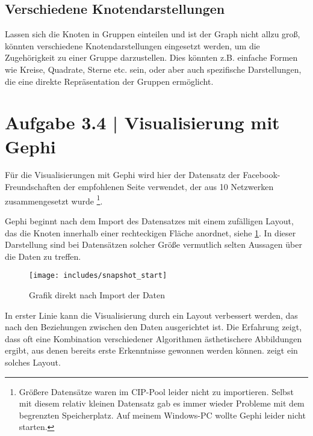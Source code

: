 \documentclass[a4paper,12pt,ngerman]{scrartcl}
\begin{document}
\subsection*{Verschiedene Knotendarstellungen}
Lassen sich die Knoten in Gruppen einteilen und ist der Graph nicht allzu groß, könnten verschiedene Knotendarstellungen eingesetzt werden, um die Zugehörigkeit zu einer Gruppe darzustellen. Dies könnten z.B. einfache Formen wie Kreise, Quadrate, Sterne etc. sein, oder aber auch spezifische Darstellungen, die eine direkte Repräsentation der Gruppen ermöglicht.

\section{Aufgabe 3.4 | Visualisierung mit Gephi}

%

Für die Visualisierungen mit Gephi wird hier der Datensatz der Facebook-Freundschaften der empfohlenen Seite verwendet, der aus 10 Netzwerken zusammengesetzt wurde \footnote{Größere Datensätze waren im CIP-Pool leider nicht zu importieren. Selbst mit diesem relativ kleinen Datensatz gab es immer wieder Probleme mit dem begrenzten Speicherplatz. Auf meinem Windows-PC wollte Gephi leider nicht starten.}.

Gephi beginnt nach dem Import des Datensatzes mit einem zufälligen Layout, das die Knoten innerhalb einer rechteckigen Fläche anordnet, siehe \cref{fig:start}. In dieser Darstellung sind bei Datensätzen solcher Größe vermutlich selten Aussagen über die Daten zu treffen.

\begin{figure}[ht]
    \centering
    \texttt{[image: includes/snapshot\_start]}
    \caption{Grafik direkt nach Import der Daten}
    \label{fig:start}
\end{figure}

In erster Linie kann die Visualisierung durch ein Layout verbessert werden, das nach den Beziehungen zwischen den Daten ausgerichtet ist. Die Erfahrung zeigt, dass oft eine Kombination verschiedener Algorithmen ästhetischere Abbildungen ergibt, aus denen bereits erste Erkenntnisse gewonnen werden können.  zeigt ein solches Layout.
\end{document}

